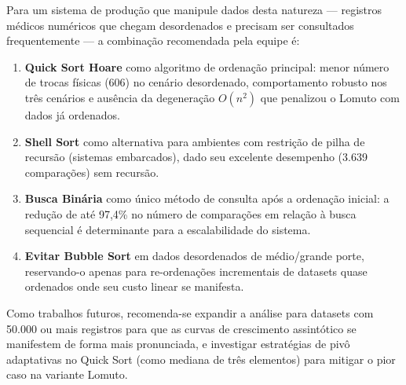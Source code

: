 \documentclass[12pt]{article}
\begin{document}
Para um sistema de produção que manipule dados desta natureza --- registros médicos numéricos que chegam desordenados e precisam ser consultados frequentemente --- a combinação recomendada pela equipe é:

\begin{enumerate}
  \item \textbf{Quick Sort Hoare} como algoritmo de ordenação principal: menor número de trocas físicas (606) no cenário desordenado, comportamento robusto nos três cenários e ausência da degeneração $O(n^2)$ que penalizou o Lomuto com dados já ordenados.
  \item \textbf{Shell Sort} como alternativa para ambientes com restrição de pilha de recursão (sistemas embarcados), dado seu excelente desempenho (3.639 comparações) sem recursão.
  \item \textbf{Busca Binária} como único método de consulta após a ordenação inicial: a redução de até 97,4\% no número de comparações em relação à busca sequencial é determinante para a escalabilidade do sistema.
  \item \textbf{Evitar Bubble Sort} em dados desordenados de médio/grande porte, reservando-o apenas para re-ordenações incrementais de datasets quase ordenados onde seu custo linear se manifesta.
\end{enumerate}

Como trabalhos futuros, recomenda-se expandir a análise para datasets com 50.000 ou mais registros para que as curvas de crescimento assintótico se manifestem de forma mais pronunciada, e investigar estratégias de pivô adaptativas no Quick Sort (como mediana de três elementos) para mitigar o pior caso na variante Lomuto.
\end{document}
